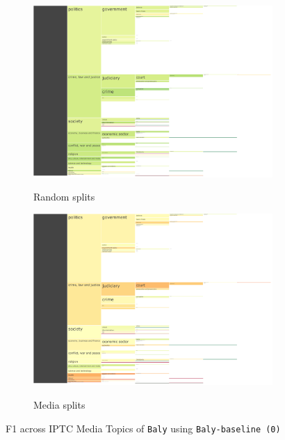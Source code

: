 \begin{figure}[!htbp]
    \centering
	\begin{subfigure}{0.49\textwidth}
            \centering
    \href{https://martinomensio.github.io/phd-project/figures/baly_iptc_weighted_f1_random_bert.html}{\includegraphics[trim={2.65cm 0cm 2.8cm 0cm},clip,width=\linewidth]{figures/baly_iptc_weighted_f1_random_bert.pdf}}
    \caption{Random splits}
    \label{fig:baly_iptc_weighted_f1_random_bert}
\end{subfigure}
\begin{subfigure}{0.49\textwidth}
            \centering
    \href{https://martinomensio.github.io/phd-project/figures/baly_iptc_weighted_f1_media_bert.html}{\includegraphics[trim={2.65cm 0cm 2.8cm 0cm},clip,width=\linewidth]{figures/baly_iptc_weighted_f1_media_bert.pdf}}
    \caption{Media splits}
    \label{fig:baly_iptc_weighted_f1_media_bert}
\end{subfigure}
\caption{F1 across IPTC Media Topics of \texttt{Baly} using \texttt{Baly-baseline (0)}}
    \label{fig:baly_iptc_weighted_f1_bert}
\end{figure}

